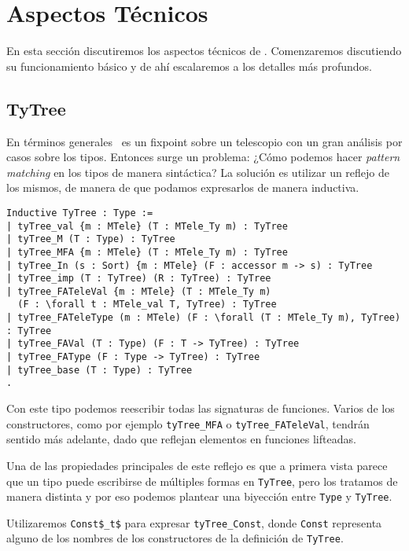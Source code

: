 \section{Aspectos Técnicos}

En esta sección discutiremos los aspectos técnicos de \lift.
Comenzaremos discutiendo su funcionamiento básico y de ahí escalaremos a los detalles más profundos. 

\subsection{TyTree}

En términos generales \lift\ es un fixpoint sobre un telescopio con un gran análisis por casos sobre los tipos.
Entonces surge un problema: ¿Cómo podemos hacer \textit{pattern matching} en los tipos de manera sintáctica?
La solución es utilizar un reflejo de los mismos, de manera de que podamos expresarlos de manera inductiva.

\begin{lstlisting}
Inductive TyTree : Type :=
| tyTree_val {m : MTele} (T : MTele_Ty m) : TyTree
| tyTree_M (T : Type) : TyTree
| tyTree_MFA {m : MTele} (T : MTele_Ty m) : TyTree
| tyTree_In (s : Sort) {m : MTele} (F : accessor m -> s) : TyTree
| tyTree_imp (T : TyTree) (R : TyTree) : TyTree
| tyTree_FATeleVal {m : MTele} (T : MTele_Ty m)
  (F : \forall t : MTele_val T, TyTree) : TyTree
| tyTree_FATeleType (m : MTele) (F : \forall (T : MTele_Ty m), TyTree) : TyTree
| tyTree_FAVal (T : Type) (F : T -> TyTree) : TyTree
| tyTree_FAType (F : Type -> TyTree) : TyTree
| tyTree_base (T : Type) : TyTree
.
\end{lstlisting}

Con este tipo podemos reescribir todas las signaturas de funciones. Varios de los constructores, como por ejemplo
\lstinline{tyTree_MFA} o \lstinline{tyTree_FATeleVal}, tendrán sentido más adelante, dado que reflejan elementos en
funciones lifteadas.

Una de las propiedades principales de este reflejo es que a primera vista parece que un tipo puede escribirse de múltiples formas en \lstinline{TyTree}, pero los tratamos de manera distinta y por eso podemos plantear una biyección
entre \lstinline{Type} y \lstinline{TyTree}.

Utilizaremos \lstinline{Const$_t$} para expresar \lstinline{tyTree_Const}, donde \lstinline{Const} representa alguno de los nombres de los constructores de la definición de \lstinline{TyTree}. 

